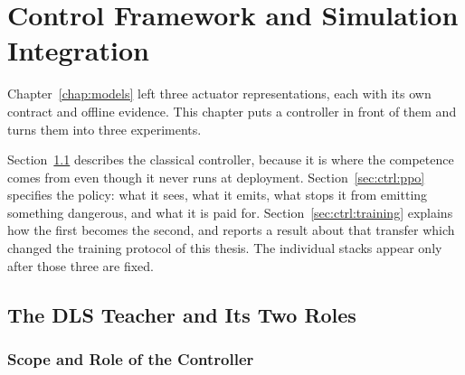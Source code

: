 \chapter{Control Framework and Simulation Integration}
\label{chap:control}

Chapter~\ref{chap:models} left three actuator representations, each with its own
contract and offline evidence. This chapter puts a controller in front of them
and turns them into three experiments.

Section~\ref{sec:ctrl:dls} describes the classical controller, because it is
where the competence comes from even though it never runs at deployment.
Section~\ref{sec:ctrl:ppo} specifies the policy: what it sees, what it emits,
what stops it from emitting something dangerous, and what it is paid for.
Section~\ref{sec:ctrl:training} explains how the first becomes the second, and
reports a result about that transfer which changed the training protocol of this
thesis. The individual stacks appear only after those three are fixed.

\section{The DLS Teacher and Its Two Roles}
\label{sec:ctrl:dls}

\subsection{Scope and Role of the Controller}

